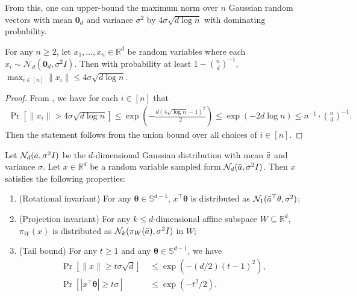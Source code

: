 \documentclass{article}\usepackage[a4paper,margin=20mm]{geometry}
\newcommand{\R}{\mathbb R}
\newcommand{\E}{\mathbb E}
\begin{document}
From this, one can upper-bound the maximum norm over $n$ Gaussian random vectors with mean $\mathbf{0}_d$ and variance $\sigma^2$ by $4\sigma \sqrt{d \log n}$ with dominating probability.
\begin{corollary}\label{cor:gaussian-globaldiam}
    For any $n \geq 2$,
    let $x_1, \ldots, x_n \in \R^d$ be random variables where each $x_i \sim \mathcal{N}_d(\mathbf{0}_d, \sigma^2 I)$. Then with probability at least $1 - \binom{n}{d}^{-1}$, $\max_{i \in [n]}\|x_i\| \leq 4 \sigma \sqrt{d\log n}$.
\end{corollary}
\begin{proof}
    From , we have for each $i \in [n]$ that
    \begin{align*}
        \Pr[\|x_i\| > 4\sigma \sqrt{d\log n}] \leq \exp(-\frac{d(4\sqrt{\log n} - 1)^2}{2}) \leq \exp(-2d\log n) \leq n^{-1} \cdot \binom{n}{d}^{-1}.
    \end{align*}    
    Then the statement follows from the union bound over all choices of $i \in [n]$.
\end{proof}


\iffalse
\begin{fact}\label{fact:properties-gaussian}
    Let $\mathcal{N}_d(\Bar{a}, \sigma^2I)$ be the $d$-dimensional Gaussian distribution with mean $\Bar{a}$ and variance $\sigma$. Let $x\in \R^d$ be a random variable sampled form $\mathcal{N}_d(\Bar{a}, \sigma^2I)$. Then $x$ satisfies the following properties:
    \begin{enumerate}
        \item {(Rotational invariant)} For any $\mathbf{\theta} \in \mathbb{S}^{d-1}$, $x^\top \mathbf{\theta}$ is distributed as $\mathcal{N}_1(\Bar{a}^\top\mathbf{\theta}, \sigma^2)$; 
        \item {(Projection invariant)} For any $k\leq d$-dimensional affine subspace $W\subseteq \R^d$, $\pi_W(x)$ is distributed as $\mathcal{N}_k(\pi_W(\Bar{a}), \sigma^2 I)$ in $W$;
        \item {(Tail bound)} For any $t\geq 1$ and any $\mathbf{\theta}\in \mathbb{S}^{d-1}$, we have
        \begin{align*}
            \Pr[\|x\| \geq t\sigma \sqrt{d}] & ~ \leq \exp(-(d/2)(t-1)^2), \\
            \Pr[|x^\top \mathbf{\theta}| \geq t\sigma] & ~ \leq \exp(-t^2/2).
        \end{align*}
    \end{enumerate}
\end{fact}
\end{document}
